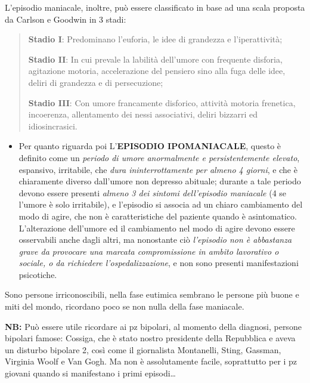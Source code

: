 \documentclass[]{article}
\begin{document}
L'episodio maniacale, inoltre, può essere classificato in base ad una
scala proposta da Carlson e Goodwin in 3 stadi:

\begin{quote}
\textbf{Stadio I}: Predominano l'euforia, le idee di grandezza e
l'iperattività;

\textbf{Stadio II}: In cui prevale la labilità dell'umore con frequente
disforia, agitazione motoria, accelerazione del pensiero sino alla fuga
delle idee, deliri di grandezza e di persecuzione;

\textbf{Stadio III}: Con umore francamente disforico, attività motoria
frenetica, incoerenza, allentamento dei nessi associativi, deliri
bizzarri ed idiosincrasici.
\end{quote}

\begin{itemize}
\item
  Per quanto riguarda poi L'\textbf{EPISODIO IPOMANIACALE}, questo è
  definito come un \emph{periodo di umore anormalmente e
  persistentemente elevato}, espansivo, irritabile, che \emph{dura
  ininterrottamente per almeno 4 giorni}, e che è chiaramente diverso
  dall'umore non depresso abituale; durante a tale periodo devono essere
  presenti \emph{almeno 3 dei sintomi dell'episodio maniacale} (4 se
  l'umore è solo irritabile), e l'episodio si associa ad un chiaro
  cambiamento del modo di agire, che non è caratteristiche del paziente
  quando è asintomatico. L'alterazione dell'umore ed il cambiamento nel
  modo di agire devono essere osservabili anche dagli altri, ma
  nonostante ciò \emph{l'episodio non è abbastanza grave da provocare
  una marcata compromissione in ambito lavorativo o sociale, o da
  richiedere l'ospedalizzazione}, e non sono presenti manifestazioni
  psicotiche.
\end{itemize}

Sono persone irriconoscibili, nella fase eutimica sembrano le persone
più buone e miti del mondo, ricordano poco se non nulla della fase
maniacale.

\textbf{NB:} Può essere utile ricordare ai pz bipolari, al momento della
diagnosi, persone bipolari famose: Cossiga, che è stato nostro
presidente della Repubblica e aveva un disturbo bipolare 2, così come il
giornalista Montanelli, Sting, Gassman, Virginia Woolf e Van Gogh. Ma
non è assolutamente facile, soprattutto per i pz giovani quando si
manifestano i primi episodi\ldots{}
\end{document}
